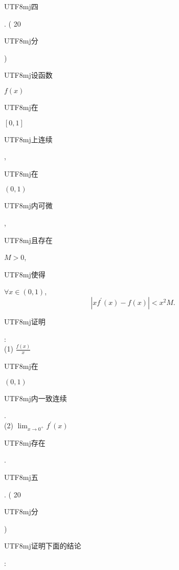 \documentclass[10pt]{article}
\begin{document}
\begin{CJK}{UTF8}{mj}四\end{CJK}. ( 20 \begin{CJK}{UTF8}{mj}分\end{CJK}) \begin{CJK}{UTF8}{mj}设函数\end{CJK} $f(x)$ \begin{CJK}{UTF8}{mj}在\end{CJK} $[0,1]$ \begin{CJK}{UTF8}{mj}上连续\end{CJK}, \begin{CJK}{UTF8}{mj}在\end{CJK} $(0,1)$ \begin{CJK}{UTF8}{mj}内可微\end{CJK}, \begin{CJK}{UTF8}{mj}且存在\end{CJK} $M>0$, \begin{CJK}{UTF8}{mj}使得\end{CJK} $\forall x \in(0,1)$,
$$
\left|x f^{\prime}(x)-f(x)\right|<x^{2} M .
$$
\begin{CJK}{UTF8}{mj}证明\end{CJK}:\\
(1) $\frac{f(x)}{x}$ \begin{CJK}{UTF8}{mj}在\end{CJK} $(0,1)$ \begin{CJK}{UTF8}{mj}内一致连续\end{CJK}.\\
(2) $\lim _{x \rightarrow 0^{+}} f^{\prime}(x)$ \begin{CJK}{UTF8}{mj}存在\end{CJK}.

\begin{CJK}{UTF8}{mj}五\end{CJK}. ( 20 \begin{CJK}{UTF8}{mj}分\end{CJK}) \begin{CJK}{UTF8}{mj}证明下面的结论\end{CJK}:
\end{document}
